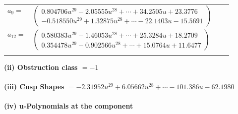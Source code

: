 \documentclass[1p]{elsarticle_modified}
\theoremstyle{definition}
\begin{document}
\begin{tabular}{m{7pt} m{180pt} m{7pt} m{180pt} }
\flushright $a_{9}=$&$\begin{pmatrix}0.804706 u^{29}-2.05555 u^{28}+\cdots+34.2505 u+23.3776\\-0.518550 u^{29}+1.32875 u^{28}+\cdots-22.1403 u-15.5691\end{pmatrix}$ \\
\flushright $a_{12}=$&$\begin{pmatrix}0.580383 u^{29}-1.46053 u^{28}+\cdots+25.3284 u+18.2709\\0.354478 u^{29}-0.902566 u^{28}+\cdots+15.0764 u+11.6477\end{pmatrix}$\\&\end{tabular}
\flushleft \textbf{(ii) Obstruction class $= -1$}\\~\\
\flushleft \textbf{(iii) Cusp Shapes $= -2.31952 u^{29}+6.05662 u^{28}+\cdots-101.386 u-62.1980$}\\~\\
\newpage\renewcommand{\arraystretch}{1}
\flushleft \textbf{(iv) u-Polynomials at the component}\newline \\
\end{document}
